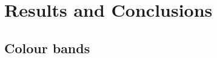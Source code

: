 \chapter{Results and Conclusions}
\begin{comment}
This section should discuss issues you encountered as you tried to implement your experiments. What were the results of running the experiments? What conclusions can you draw from these results? What graphs or other information have you assessed regarding your experiments? Discuss those.

During the work, you might have found that elements of your experiments were unnecessary or overly complex; perhaps third-party libraries were available that simplified some of the functions that you intended to implement. If things were easier in some areas, then how did you adapt your project to take account of your findings?

It is more likely that things were more complex than you first thought. In particular, were there any problems or difficulties that you found during implementation that you had to address? Did such problems simply delay you or were they more significant?

If you had multiple experiments to run, it may be sensible to discuss each experiment in separate sections.
\end{comment}


\section{Colour bands}

